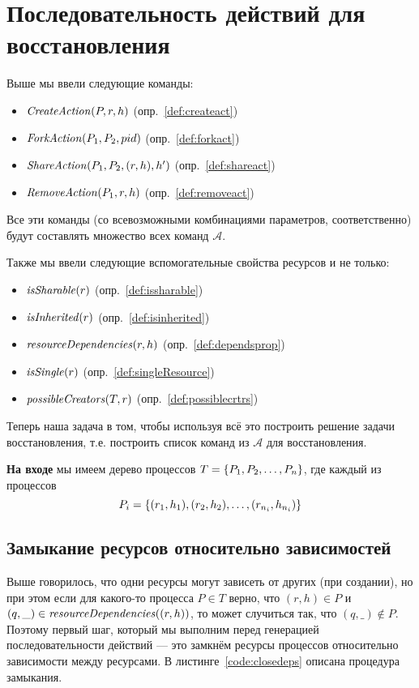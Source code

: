 \section{Последовательность действий для восстановления}

Выше мы ввели следующие команды:

\begin{itemize}
	\item $\text{\textit{CreateAction}}(P, r, h)$ (опр.~\ref{def:createact})
	\item $\text{\textit{ForkAction}}(P_1, P_2, pid)$ (опр.~\ref{def:forkact})
	\item $\text{\textit{ShareAction}}(P_1, P_2, (r, h), h')$ (опр.~\ref{def:shareact})
	\item $\text{\textit{RemoveAction}}(P_1, r, h)$ (опр.~\ref{def:removeact})
\end{itemize}

Все эти команды (со всевозможными комбинациями параметров, соответственно) будут составлять множество всех команд $\mathcal{A}$.

Также мы ввели следующие вспомогательные свойства ресурсов и не только:

\begin{itemize}
	\item $\text{\textit{isSharable}}(r)$ (опр.~\ref{def:issharable})
	\item $\text{\textit{isInherited}}(r)$ (опр.~\ref{def:isinherited})
	\item $\text{\textit{resourceDependencies}}(r, h)$ (опр.~\ref{def:dependsprop})
	\item $\text{\textit{isSingle}}(r)$ (опр.~\ref{def:singleResource})
	\item $\text{\textit{possibleCreators}}(T, r)$ (опр.~\ref{def:possiblecrtrs})
\end{itemize}

Теперь наша задача в том, чтобы используя всё это построить решение задачи восстановления, т.е. построить список команд из $\mathcal{A}$ для восстановления.

\textbf{На входе} мы имеем дерево процессов $T = \left\lbrace P_1, P_2, \ldots, P_n \right\rbrace$, где каждый из процессов 
\begin{equation*}
P_i = \left\lbrace (r_1, h_1), (r_2, h_2), \ldots, (r_{n_i}, h_{n_i}) \right\rbrace
\end{equation*}


\subsection{Замыкание ресурсов относительно зависимостей}

Выше говорилось, что одни ресурсы могут зависеть от других (при создании), но при этом если для какого-то процесса $P \in T$ верно, что $(r, h) \in P$ и $(q, \_) \in \text{\textit{resourceDependencies}}((r, h))$, то может случиться так, что $(q, \_) \notin P$. Поэтому первый шаг, который мы выполним перед генерацией последовательности действий --- это замкнём ресурсы процессов относительно зависимости между ресурсами. В листинге~\ref{code:closedeps} описана процедура замыкания. 

